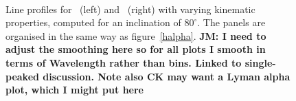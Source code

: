 \documentclass[preprint, a4paper, 11pt]{aastex}
\begin{document}
\begin{figure} %
\mbox{
{}
\quad
{}  
}
\caption{
Line profiles for \civ\ (left) and \heiiuv\  (right) with varying kinematic 
properties, computed for an inclination of $80^\circ$. 
The panels are organised in the same way as figure~\ref{halpha}.
{\bf JM: I need to adjust the smoothing here so for all plots I smooth
in terms of Wavelength rather than bins. Linked to single-peaked discussion. 
Note also CK may want a Lyman alpha plot, which I might put here}
}
\label{uvlines}
\end{figure}


%
%
\end{document}
